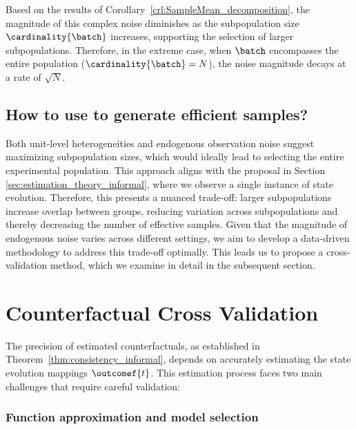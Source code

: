 Based on the results of Corollary~\ref{crl:SampleMean_decomposition}, the magnitude of this complex noise diminishes as the subpopulation size $\cardinality{\batch}$ increases, supporting the selection of larger subpopulations. Therefore, in the extreme case, when $\batch$ encompasses the entire population ($\cardinality{\batch} = N$), the noise magnitude decays at a rate of $\sqrt{N}$.


\subsection{How to use \batchingAcronym{} to generate efficient samples?}
\label{sec:batching}
%
Both unit-level heterogeneities and endogenous observation noise suggest maximizing subpopulation sizes, which would ideally lead to selecting the entire experimental population. 
This approach aligns with the proposal in Section \ref{sec:estimation_theory_informal}, where we observe a single instance of state evolution. 
Therefore, this presents a nuanced trade-off: larger subpopulations increase overlap between groups, reducing variation across subpopulations and thereby decreasing the number of effective samples. Given that the magnitude of endogenous noise varies across different settings, we aim to develop a data-driven methodology to address this trade-off optimally. This leads us to propose a cross-validation method, which we examine in detail in the subsequent section.


\section{Counterfactual Cross Validation}
\label{sec:C-CV}
%
The precision of estimated counterfactuals, as established in Theorem~\ref{thm:consistency_informal}, depends on accurately estimating the state evolution mappings $\outcomef{t}$. This estimation process faces two main challenges that require careful validation:

\subsubsection*{Function approximation and model selection} 

